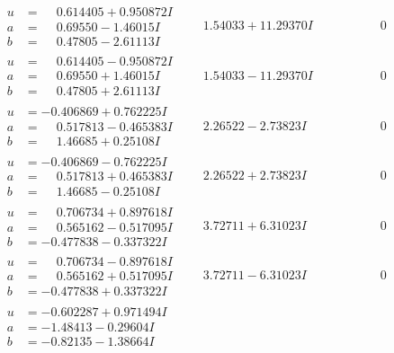 \documentclass[1p]{elsarticle_modified}
\theoremstyle{definition}
\begin{document}
$$\begin{array}{c|c|c}
\begin{aligned}
u &= \phantom{-}0.614405 + 0.950872 I \\
a &= \phantom{-}0.69550 - 1.46015 I \\
b &= \phantom{-}0.47805 - 2.61113 I\end{aligned}
 & \phantom{-}1.54033 + 11.29370 I & \phantom{-0.000000 } 0 \\ \hline\begin{aligned}
u &= \phantom{-}0.614405 - 0.950872 I \\
a &= \phantom{-}0.69550 + 1.46015 I \\
b &= \phantom{-}0.47805 + 2.61113 I\end{aligned}
 & \phantom{-}1.54033 - 11.29370 I & \phantom{-0.000000 } 0 \\ \hline\begin{aligned}
u &= -0.406869 + 0.762225 I \\
a &= \phantom{-}0.517813 - 0.465383 I \\
b &= \phantom{-}1.46685 + 0.25108 I\end{aligned}
 & \phantom{-}2.26522 - 2.73823 I & \phantom{-0.000000 } 0 \\ \hline\begin{aligned}
u &= -0.406869 - 0.762225 I \\
a &= \phantom{-}0.517813 + 0.465383 I \\
b &= \phantom{-}1.46685 - 0.25108 I\end{aligned}
 & \phantom{-}2.26522 + 2.73823 I & \phantom{-0.000000 } 0 \\ \hline\begin{aligned}
u &= \phantom{-}0.706734 + 0.897618 I \\
a &= \phantom{-}0.565162 - 0.517095 I \\
b &= -0.477838 - 0.337322 I\end{aligned}
 & \phantom{-}3.72711 + 6.31023 I & \phantom{-0.000000 } 0 \\ \hline\begin{aligned}
u &= \phantom{-}0.706734 - 0.897618 I \\
a &= \phantom{-}0.565162 + 0.517095 I \\
b &= -0.477838 + 0.337322 I\end{aligned}
 & \phantom{-}3.72711 - 6.31023 I & \phantom{-0.000000 } 0 \\ \hline\begin{aligned}
u &= -0.602287 + 0.971494 I \\
a &= -1.48413 - 0.29604 I \\
b &= -0.82135 - 1.38664 I\end{aligned}

\end{array}$$
\end{document}
